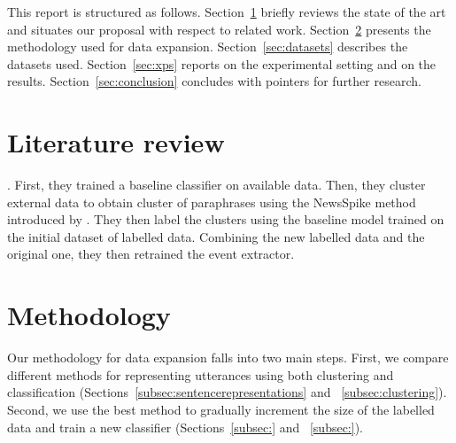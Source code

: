 \documentclass[11pt]{article}
\begin{document}
This report is structured as follows. Section~\ref{sec:relatedwork}
briefly reviews the state of the art and situates our proposal with
respect to related work.  Section~\ref{sec:methodology} presents the
methodology used for data expansion. Section~\ref{sec:datasets} describes
the datasets used. Section~\ref{sec:xps} reports on the experimental
setting and on the results. Section~\ref{sec:conclusion} concludes
with pointers for further research.

\section{Literature review}
\label{sec:relatedwork}

\cite{N18-2058} . First, they trained a baseline classifier on available data. Then, they cluster external data to obtain cluster of paraphrases using the NewsSpike method introduced by \cite{zhang2015}. They then label the clusters using the baseline model trained on the initial dataset of labelled data. Combining the new labelled data and the original one, they then retrained the event extractor.

\section{Methodology}
\label{sec:methodology}

Our methodology for data expansion falls into two main steps. First, we compare different methods for representing utterances using both clustering and classification (Sections~\ref{subsec:sentencerepresentations} and ~\ref{subsec:clustering}). Second, we use the best method to gradually increment the size of the labelled data and train a new classifier  (Sections~\ref{subsec:} and ~\ref{subsec:}). 



\end{document}
